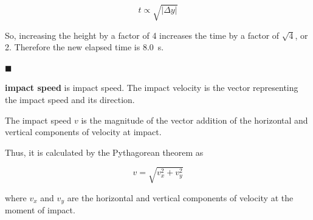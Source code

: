\documentclass[dvipsnames]{article}
\begin{document}
\begin{equation*}
    t \propto \sqrt{\left|\Delta y\right|}
\end{equation*}

So, increasing the height by a factor of 4 increases the time by a factor of $\sqrt{4}$, or 2. Therefore the new elapsed time is \SI{8.0}{s}.

\hfill $\blacksquare$

\textbf{\Gls{impact speed}} is \glsdesc{impact speed}. The impact velocity is the vector representing the impact speed and its direction. 

\begin{center}
\end{center}



The impact speed $v$ is the magnitude of the vector addition of the horizontal and vertical components of velocity at impact.


\begin{center}
\end{center}

Thus, it is calculated by the Pythagorean theorem as

\begin{equation} \label{KBgFF}
    v = \sqrt{v_x^2 + v_y^2}
\end{equation}

where $v_x$ and $v_y$ are the horizontal and vertical components of velocity at the moment of impact.
\end{document}
